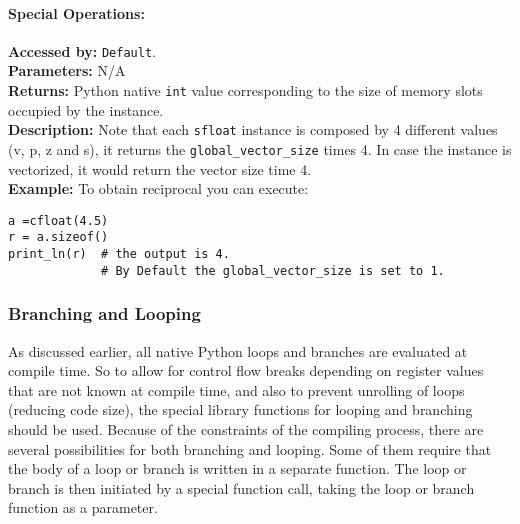\paragraph{Special Operations:}
                        \textbf{Accessed by:} \verb|Default|. \\
                        \textbf{Parameters:} N/A \\
                        \textbf{Returns:}
                                 Python native \verb|int| value corresponding to the size of memory slots occupied by the instance. \\
                        \textbf{Description:}
                                Note that each \verb|sfloat| instance is composed by 4 
                                different values (v, p, z and s), 
                                it returns the \verb|global_vector_size| times 4. 
                                In case the instance is vectorized, 
                                it would return the vector size time 4.\\
                \textbf{Example:}
                    To obtain reciprocal you can execute:
\begin{lstlisting}
a =cfloat(4.5)             
r = a.sizeof()
print_ln(r)  # the output is 4. 
			 # By Default the global_vector_size is set to 1.
\end{lstlisting}

\subsubsection{Branching and Looping}
As discussed earlier, all native Python loops and branches are evaluated at
compile time. So to allow for control flow breaks depending on register values
that are not known at compile time, and also to prevent unrolling of loops
(reducing code size), the special
library functions for looping and branching should be used.
Because of the constraints of the compiling process, there are several
possibilities for both branching and looping.
Some of them require that the body of a loop or branch is written
in a separate function. The loop or branch is then initiated by a special
function call, taking the loop or branch function as a parameter.

